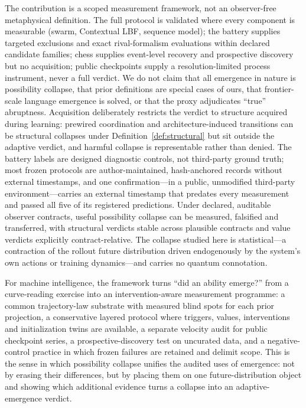 \documentclass[11pt]{article}
\theoremstyle{definition}
\begin{document}
The contribution is a scoped measurement framework, not an
observer-free metaphysical definition. The full protocol is validated
where every component is measurable (swarm, Contextual LBF, sequence
model); the battery supplies targeted exclusions and exact
rival-formalism evaluations within declared candidate families; chess
supplies event-level recovery and prospective discovery but no
acquisition; public checkpoints supply a resolution-limited process
instrument, never a full verdict. We do not claim that all emergence
in nature is possibility collapse, that prior definitions are special
cases of ours, that frontier-scale language emergence is solved, or
that the proxy adjudicates ``true'' abruptness. Acquisition
deliberately restricts the verdict to structure acquired during
learning: prewired coordination and architecture-induced transitions
can be structural collapses under Definition~\ref{def:structural} but
sit outside the adaptive verdict, and harmful collapse is
representable rather than denied. The battery labels are designed
diagnostic controls, not third-party ground truth; most frozen
protocols are author-maintained, hash-anchored records without
external timestamps, and one confirmation---in a public, unmodified
third-party environment---carries an external timestamp that predates
every measurement and passed all five of its registered predictions.
Under
declared, auditable observer contracts, useful possibility collapse
can be measured, falsified and transferred, with structural verdicts
stable across plausible contracts and value verdicts explicitly
contract-relative.
The collapse studied here is statistical---a contraction of the rollout
future distribution driven endogenously by the system's own actions or
training dynamics---and carries no quantum connotation.

For machine intelligence, the framework turns ``did an ability
emerge?'' from a curve-reading exercise into an intervention-aware
measurement programme: a common trajectory-law substrate with measured
blind spots for each prior projection, a conservative layered protocol
where triggers, values, interventions and initialization twins are
available, a separate velocity audit for public checkpoint series, a
prospective-discovery test on uncurated data, and a negative-control
practice in which frozen failures are retained and delimit scope. This
is the sense in which possibility collapse unifies the audited uses of
emergence: not by erasing their differences, but by placing them on
one future-distribution object and showing which additional evidence
turns a collapse into an adaptive-emergence verdict.
\end{document}
